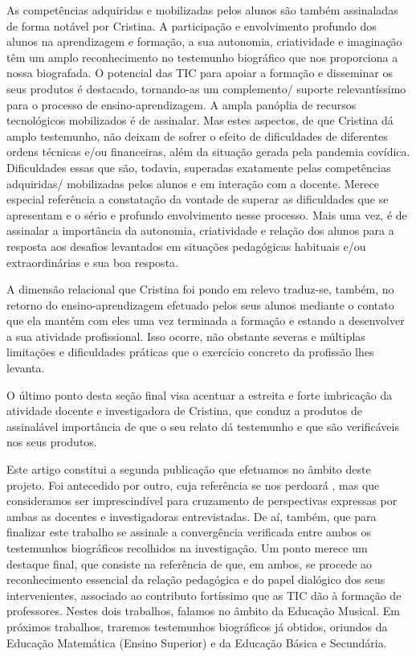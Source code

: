 \documentclass{textolivre}
\begin{document}
As competências adquiridas e mobilizadas pelos alunos são também assinaladas de
forma notável por Cristina. A participação e envolvimento profundo dos alunos
na aprendizagem e formação, a sua autonomia, criatividade e imaginação têm um
amplo reconhecimento no testemunho biográfico que nos proporciona a nossa
biografada. O potencial das TIC para apoiar a formação e disseminar os seus
produtos é destacado, tornando-as um complemento/ suporte relevantíssimo para o
processo de ensino-aprendizagem. A ampla panóplia de recursos tecnológicos
mobilizados é de assinalar. Mas estes aspectos, de que Cristina dá amplo
testemunho, não deixam de sofrer o efeito de dificuldades de diferentes ordens
técnicas e/ou financeiras, além da situação gerada pela pandemia covídica.
Dificuldades essas que são, todavia, superadas exatamente pelas competências
adquiridas/ mobilizadas pelos alunos e em interação com a docente. Merece
especial referência a constatação da vontade de superar as dificuldades que se
apresentam e o sério e profundo envolvimento nesse processo. Mais uma vez, é de
assinalar a importância da autonomia, criatividade e relação dos alunos para a
resposta aos desafios levantados em situações pedagógicas habituais e/ou
extraordinárias e sua boa resposta.

A dimensão relacional que Cristina foi pondo em relevo traduz-se, também, no
retorno do ensino-aprendizagem efetuado pelos seus alunos mediante o contato
que ela mantém com eles uma vez terminada a formação e estando a desenvolver a
sua atividade profissional. Isso ocorre, não obstante severas e múltiplas
limitações e dificuldades práticas que o exercício concreto da profissão lhes
levanta.

O último ponto desta seção final visa acentuar a estreita e forte imbricação da
atividade docente e investigadora de Cristina, que conduz a produtos de
assinalável importância de que o seu relato dá testemunho e que são
verificáveis nos seus produtos.

Este artigo constitui a segunda publicação que efetuamos no âmbito deste
projeto. Foi antecedido por outro, cuja referência se nos perdoará
\cite{sadioramos2020}, mas que consideramos ser
imprescindível para cruzamento de perspectivas expressas por ambas as docentes
e investigadoras entrevistadas. De aí, também, que para finalizar este trabalho
se assinale a convergência verificada entre ambos os testemunhos biográficos
recolhidos na investigação. Um ponto merece um destaque final, que consiste na
referência de que, em ambos, se procede ao reconhecimento essencial da relação
pedagógica e do papel dialógico dos seus intervenientes, associado ao
contributo fortíssimo que as TIC dão à formação de professores. Nestes dois
trabalhos, falamos no âmbito da Educação Musical. Em próximos trabalhos,
traremos testemunhos biográficos já obtidos, oriundos da Educação Matemática
(Ensino Superior) e da Educação Básica e Secundária.




\printbibliography\label{sec-bib}
\end{document}
